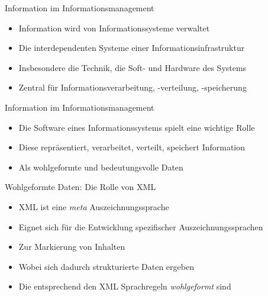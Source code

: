 \documentclass{beamer}
\begin{document}
\begin{frame}{Information im Informationsmanagement}
	
	\begin{itemize}
		\item Information wird von Informationssysteme verwaltet
		\item Die interdependenten Systeme einer Informationsinfrastruktur
		\item Insbesondere die Technik, die Soft- und Hardware des Systems
		\item Zentral für Informationsverarbeitung, -verteilung, -speicherung
	\end{itemize}
	
\end{frame}

\begin{frame}{Information im Informationsmanagement}
	
	\begin{itemize}
		\item Die Software eines Informationssystems spielt eine wichtige Rolle
		\item Diese repräsentiert, verarbeitet, verteilt, speichert Information
		\item Als wohlgeformte und bedeutungsvolle Daten
	\end{itemize}
	
\end{frame}

\begin{frame}{Wohlgeformte Daten: Die Rolle von XML}
	
	\begin{itemize}
		\item XML ist eine \emph{meta} Auszeichnungssprache
		\item Eignet sich für die Entwicklung spezifischer Auszeichnungssprachen
		\item Zur Markierung von Inhalten
		\item Wobei sich dadurch strukturierte Daten ergeben
		\item Die entsprechend den XML Sprachregeln \emph{wohlgeformt} sind
	\end{itemize}
	
\end{frame}
\end{document}
